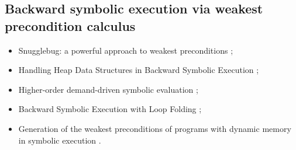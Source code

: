 \subsection*{Backward symbolic execution via weakest precondition calculus}
\begin{itemize}

\item Snugglebug: a powerful approach to weakest preconditions \cite{chandra2009bsewpc};

\item Handling Heap Data Structures in Backward Symbolic Execution \cite{husak2020bsewpc};

\item Higher-order demand-driven symbolic evaluation \cite{zachary2020bsewpc};

\item Backward Symbolic Execution with Loop Folding \cite{chalupa2021bsewpc};

\item Generation of the weakest preconditions of programs with dynamic memory in symbolic execution \cite{misonizhnik2022bsewpc}.

\end{itemize}